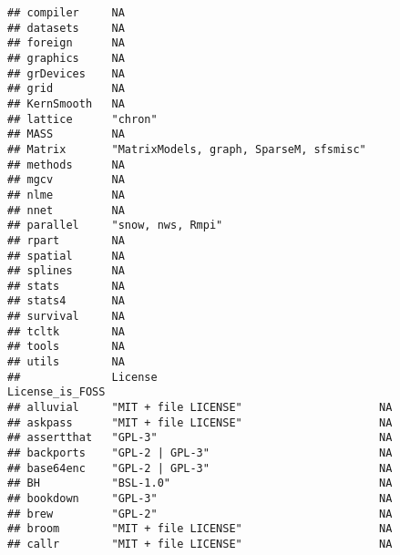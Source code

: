 \documentclass[]{book}
\begin{document}
\begin{verbatim}
## compiler     NA                                                        
## datasets     NA                                                        
## foreign      NA                                                        
## graphics     NA                                                        
## grDevices    NA                                                        
## grid         NA                                                        
## KernSmooth   NA                                                        
## lattice      "chron"                                                   
## MASS         NA                                                        
## Matrix       "MatrixModels, graph, SparseM, sfsmisc"                   
## methods      NA                                                        
## mgcv         NA                                                        
## nlme         NA                                                        
## nnet         NA                                                        
## parallel     "snow, nws, Rmpi"                                         
## rpart        NA                                                        
## spatial      NA                                                        
## splines      NA                                                        
## stats        NA                                                        
## stats4       NA                                                        
## survival     NA                                                        
## tcltk        NA                                                        
## tools        NA                                                        
## utils        NA                                                        
##              License                                  License_is_FOSS
## alluvial     "MIT + file LICENSE"                     NA             
## askpass      "MIT + file LICENSE"                     NA             
## assertthat   "GPL-3"                                  NA             
## backports    "GPL-2 | GPL-3"                          NA             
## base64enc    "GPL-2 | GPL-3"                          NA             
## BH           "BSL-1.0"                                NA             
## bookdown     "GPL-3"                                  NA             
## brew         "GPL-2"                                  NA             
## broom        "MIT + file LICENSE"                     NA             
## callr        "MIT + file LICENSE"                     NA             

\end{verbatim}
\end{document}
